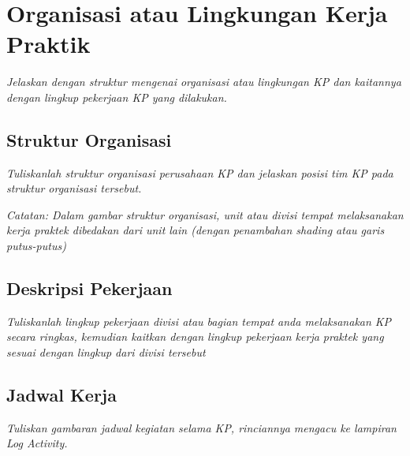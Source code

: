 \chapter{Organisasi atau Lingkungan Kerja Praktik}
\textit{Jelaskan dengan struktur mengenai organisasi atau lingkungan KP dan kaitannya dengan lingkup pekerjaan KP yang dilakukan.}

\section{Struktur Organisasi}
\textit{Tuliskanlah struktur organisasi perusahaan KP dan jelaskan posisi tim KP pada struktur organisasi tersebut.}

\textit{Catatan: Dalam gambar struktur organisasi, unit atau divisi tempat melaksanakan kerja praktek dibedakan dari unit lain (dengan penambahan shading atau garis putus-putus)}

\section{Deskripsi Pekerjaan}
\textit{Tuliskanlah lingkup pekerjaan divisi atau bagian tempat anda melaksanakan KP secara ringkas, kemudian kaitkan dengan lingkup pekerjaan kerja praktek yang sesuai dengan lingkup dari divisi tersebut}

\section{Jadwal Kerja}
\textit{Tuliskan gambaran jadwal kegiatan selama KP, rinciannya mengacu ke lampiran Log Activity.}